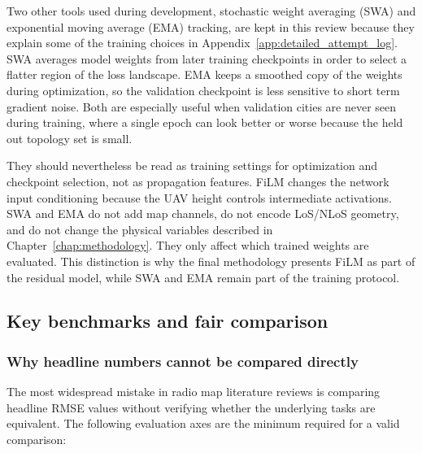 Two other tools used during development, stochastic weight averaging (SWA)
\cite{izmailov2018swa} and exponential moving average (EMA) tracking, are kept
in this review because they explain some of the training choices in
Appendix~\ref{app:detailed_attempt_log}. SWA averages model weights from later
training checkpoints in order to select a flatter region of the loss landscape.
EMA keeps a smoothed copy of the weights during optimization, so the validation
checkpoint is less sensitive to short term gradient noise. Both are especially
useful when validation cities are never seen during training, where a single
epoch can look better or worse because the held out topology set is small.

They should nevertheless be read as training settings for optimization and
checkpoint selection, not as propagation features. FiLM changes the network
input conditioning because the UAV height controls intermediate activations.
SWA and EMA do not add map channels, do not encode LoS/NLoS geometry, and do not
change the physical variables described in Chapter~\ref{chap:methodology}.
They only affect which trained weights are evaluated. This distinction is why
the final methodology presents FiLM as part of the residual model, while SWA and
EMA remain part of the training protocol.

\subsection{Key benchmarks and fair comparison}
\label{sec:soa_benchmarks}

\subsubsection{Why headline numbers cannot be compared directly}

The most widespread mistake in radio map literature reviews is comparing
headline RMSE values without verifying whether the underlying tasks are
equivalent.  The following evaluation axes are the minimum required for a
valid comparison:

